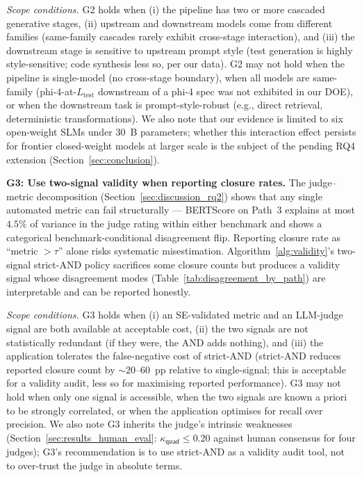 \emph{Scope conditions.} G2 holds when (i) the pipeline has two or more cascaded generative stages, (ii) upstream and downstream models come from different families (same-family cascades rarely exhibit cross-stage interaction), and (iii) the downstream stage is sensitive to upstream prompt style (test generation is highly style-sensitive; code synthesis less so, per our data). G2 may not hold when the pipeline is single-model (no cross-stage boundary), when all models are same-family (phi-4-at-$L_{\text{test}}$ downstream of a phi-4 spec was not exhibited in our DOE), or when the downstream task is prompt-style-robust (e.g., direct retrieval, deterministic transformations). We also note that our evidence is limited to six open-weight SLMs under 30~B parameters; whether this interaction effect persists for frontier closed-weight models at larger scale is the subject of the pending RQ4 extension (Section~\ref{sec:conclusion}).

\textbf{G3: Use two-signal validity when reporting closure rates.} The judge--metric decomposition (Section~\ref{sec:discussion_rq2}) shows that any single automated metric can fail structurally --- BERTScore on Path~3 explains at most $4.5\%$ of variance in the judge rating within either benchmark and shows a categorical benchmark-conditional disagreement flip. Reporting closure rate as ``metric $> \tau$'' alone risks systematic misestimation. Algorithm~\ref{alg:validity}'s two-signal strict-AND policy sacrifices some closure counts but produces a validity signal whose disagreement modes (Table~\ref{tab:disagreement_by_path}) are interpretable and can be reported honestly.

\emph{Scope conditions.} G3 holds when (i) an SE-validated metric and an LLM-judge signal are both available at acceptable cost, (ii) the two signals are not statistically redundant (if they were, the AND adds nothing), and (iii) the application tolerates the false-negative cost of strict-AND (strict-AND reduces reported closure count by $\sim$$20$--$60$~pp relative to single-signal; this is acceptable for a validity audit, less so for maximising reported performance). G3 may not hold when only one signal is accessible, when the two signals are known a priori to be strongly correlated, or when the application optimises for recall over precision. We also note G3 inherits the judge's intrinsic weaknesses (Section~\ref{sec:results_human_eval}: $\kappa_{\textsf{quad}} \leq 0.20$ against human consensus for four judges); G3's recommendation is to use strict-AND as a validity audit tool, not to over-trust the judge in absolute terms.

